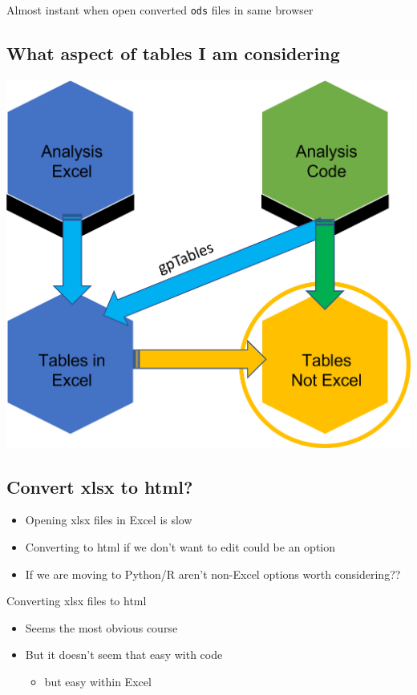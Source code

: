 \documentclass[
  letterpaper,
  DIV=11,
  numbers=noendperiod]{scrartcl}
\providecommand{\tightlist}{%
  \setlength{\itemsep}{0pt}\setlength{\parskip}{0pt}}\usepackage{longtable,booktabs,array}
\begin{document}
Almost instant when open converted \texttt{ods} files in same browser

\hypertarget{what-aspect-of-tables-i-am-considering}{%
\subsection{What aspect of tables I am
considering}\label{what-aspect-of-tables-i-am-considering}}

\includegraphics{ghtop_images/tables.png}

\hypertarget{convert-xlsx-to-html}{%
\subsection{Convert xlsx to html?}\label{convert-xlsx-to-html}}

\begin{itemize}
\tightlist
\item
  Opening xlsx files in Excel is slow
\item
  Converting to html if we don't want to edit could be an option
\item
  If we are moving to Python/R aren't non-Excel options worth
  considering??
\end{itemize}

Converting xlsx files to html

\begin{itemize}
\tightlist
\item
  Seems the most obvious course
\item
  But it doesn't seem that easy with code

  \begin{itemize}
  \tightlist
  \item
    but easy within Excel
  \end{itemize}
\end{itemize}
\end{document}
